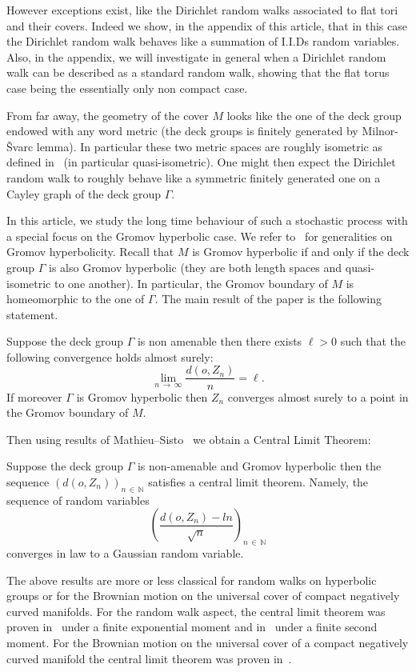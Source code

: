 \documentclass[AHL,Unicode,longabstracts,published]{cedram}
\newcommand{\NN}{\mathbb{N}}
\newcommand{\tv}{\rightarrow}
\newcommand{\G}{\Gamma}
\begin{document}
However exceptions exist, like the Dirichlet random walks associated to flat tori and their covers. Indeed we show, in the appendix of this article, that in this case the Dirichlet random walk behaves like a summation of I.I.Ds random variables. Also, in the appendix, we will investigate in general when a Dirichlet random walk can be described as a standard random walk, showing that the flat torus case being the essentially only non compact case. 

From far away, the geometry of the cover $M$ looks like the one of the deck group endowed with any word metric (the deck groups is finitely generated by Milnor-Švarc lemma). In particular these two metric spaces are roughly isometric as defined in~\cite{artkanai} (in particular quasi-isometric). One might then expect the Dirichlet random walk to roughly behave like a symmetric finitely generated one on a Cayley graph of the deck group $\Gamma$. 

In this article, we study the long time behaviour of such a stochastic process with a special focus on the Gromov hyperbolic case. We refer to~\cite{GdlH} for generalities on Gromov hyperbolicity. Recall that $M$ is Gromov hyperbolic if and only if the deck group $\G$ is also Gromov hyperbolic (they are both length spaces and quasi-isometric to one another). In particular, the Gromov boundary of $M$ is homeomorphic to the one of $\Gamma$. The main result of the paper is the following statement.

\begin{theo}\label{th-convergence dans le bord intro}
Suppose the deck group $\G$ is non amenable then there exists $\ell>0$ such that the following convergence holds almost surely:
\[
\lim_{n\,\tv\,\infty} \frac{d(o,Z_n)}{n}=\ell.
\]
If moreover $\G$ is Gromov hyperbolic then $Z_n$ converges almost surely to a point in the Gromov boundary of $M$.
\end{theo}

Then using results of Mathieu--Sisto~\cite{artmathieusisto} we obtain a Central Limit Theorem:
\begin{theo}\label{th-main-asymptotic-behaviour-of-Zn}
Suppose the deck group $\G$ is non-amenable and Gromov hyperbolic then the sequence $(d(o, Z_n))_{n\,\in\,\NN}$ satisfies a central limit theorem. Namely, the sequence of random variables
\[
\left(\frac{d(o, Z_n) - l n}{\sqrt{n}} \right)_{n\,\in\,\NN}
\]
converges in law to a Gaussian random variable.
\end{theo}

The above results are more or less classical for random walks on hyperbolic groups or for the Brownian motion on the universal cover of compact negatively curved manifolds. For the random walk aspect, the central limit theorem was proven in~\cite{artscandcentrallimit} under a finite exponential moment and in~\cite{artbqcentrallimit} under a finite second moment. For the Brownian motion on the universal cover of a compact negatively curved manifold the central limit theorem was proven in~\cite{ledrappierCLT}.
\end{document}
